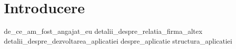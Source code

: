 \chapter{Introducere}
{de_ce_am_fost_angajat_eu}
{detalii_despre_relatia_firma_altex}
{detalii_despre_dezvoltarea_aplicatiei}
{despre_aplicatie}
{structura_aplicatiei}

